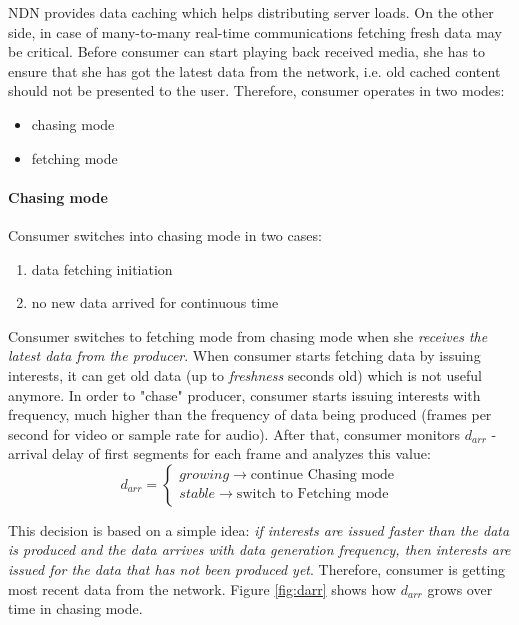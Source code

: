 \documentclass[10pt]{proc}
\begin{document}
NDN provides data caching which helps distributing server loads. On the other side, in case of many-to-many real-time communications fetching fresh data may be critical. 
Before consumer can start playing back received media, she has to ensure that she has got the latest data from the network, i.e. old cached content should not be presented to the user. Therefore, consumer operates in two modes: 
\begin{itemize}
\item chasing mode 
\item fetching mode
\end{itemize}

\paragraph{Chasing mode}
Consumer switches into chasing mode in two cases:
\begin{enumerate}
\item data fetching initiation
\item no new data arrived for continuous time
\end{enumerate}

Consumer switches to fetching mode from chasing mode when she \textit{receives the latest data from the producer}. When consumer starts fetching data by issuing interests, it can get old data (up to \textit{freshness} seconds old) which is not useful anymore. In order to "chase" producer, consumer starts issuing interests with frequency, much higher than the frequency of data being produced (frames per second for video or sample rate for audio). After that, consumer monitors $d_{arr}$ - arrival delay of first segments for each frame and analyzes this value:
\begin{equation}
d_{arr} = \left\{\begin{matrix}
growing \rightarrow \mbox{continue Chasing mode}\\ 
stable \rightarrow \mbox{switch to Fetching mode}
\end{matrix}\right.
\end{equation}

This decision is based on a simple idea: \textit{if interests are issued faster than the data is produced and the data arrives with data generation frequency, then interests are issued for the data that has not been produced yet}. Therefore, consumer is getting most recent data from the network. Figure \ref{fig:darr} shows how $d_{arr}$ grows over time in chasing mode.
\end{document}
